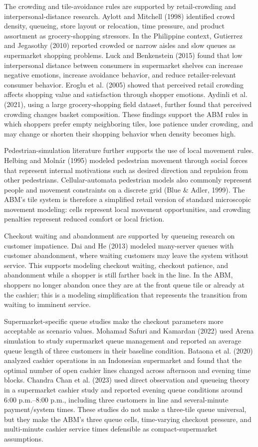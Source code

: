 \documentclass[12pt]{article}
\begin{document}
The crowding and tile-avoidance rules are supported by retail-crowding and interpersonal-distance research. Aylott and Mitchell (1998) identified crowd density, queueing, store layout or relocation, time pressure, and product assortment as grocery-shopping stressors. In the Philippine context, Gutierrez and Jegasothy (2010) reported crowded or narrow aisles and slow queues as supermarket shopping problems. Luck and Benkenstein (2015) found that low interpersonal distance between consumers in supermarket shelves can increase negative emotions, increase avoidance behavior, and reduce retailer-relevant consumer behavior. Eroglu et al. (2005) showed that perceived retail crowding affects shopping value and satisfaction through shopper emotions. Aydinli et al. (2021), using a large grocery-shopping field dataset, further found that perceived crowding changes basket composition. These findings support the ABM rules in which shoppers prefer empty neighboring tiles, lose patience under crowding, and may change or shorten their shopping behavior when density becomes high.

Pedestrian-simulation literature further supports the use of local movement rules. Helbing and Moln\'ar (1995) modeled pedestrian movement through social forces that represent internal motivations such as desired direction and repulsion from other pedestrians. Cellular-automata pedestrian models also commonly represent people and movement constraints on a discrete grid (Blue \& Adler, 1999). The ABM's tile system is therefore a simplified retail version of standard microscopic movement modeling: cells represent local movement opportunities, and crowding penalties represent reduced comfort or local friction.

Checkout waiting and abandonment are supported by queueing research on customer impatience. Dai and He (2013) modeled many-server queues with customer abandonment, where waiting customers may leave the system without service. This supports modeling checkout waiting, checkout patience, and abandonment while a shopper is still farther back in the line. In the ABM, shoppers no longer abandon once they are at the front queue tile or already at the cashier; this is a modeling simplification that represents the transition from waiting to imminent service.

Supermarket-specific queue studies make the checkout parameters more acceptable as scenario values. Mohamad Safuri and Kamardan (2022) used Arena simulation to study supermarket queue management and reported an average queue length of three customers in their baseline condition. Bataona et al. (2020) analyzed cashier operations in an Indonesian supermarket and found that the optimal number of open cashier lines changed across afternoon and evening time blocks. Chandra Chan et al. (2023) used direct observation and queueing theory in a supermarket cashier study and reported evening queue conditions around 6:00 p.m.--8:00 p.m., including three customers in line and several-minute payment/system times. These studies do not make a three-tile queue universal, but they make the ABM's three queue cells, time-varying checkout pressure, and multi-minute cashier service times defensible as compact-supermarket assumptions.
\end{document}

